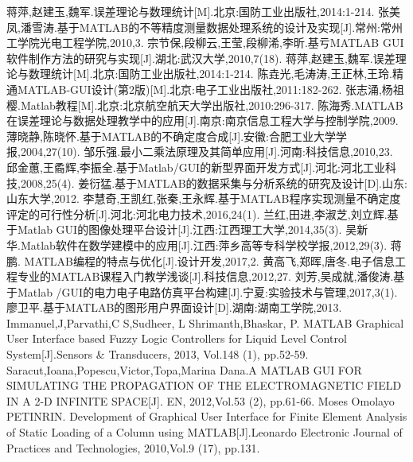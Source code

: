 \begin{thebibliography}{0}
	 蒋萍,赵建玉,魏军.误差理论与数理统计[M].北京:国防工业出版社,2014:1-214.
	 张美凤,潘雪涛.基于MATLAB的不等精度测量数据处理系统的设计及实现[J].常州:常州工学院光电工程学院,2010,3.
	 宗节保,段柳云,王莹,段柳浠,李昕.基亏MATLAB GUI软件制作方法的研究与实现[J].湖北:武汉大学,2010,7(18).
	 蒋萍,赵建玉,魏军.误差理论与数理统计[M].北京:国防工业出版社,2014:1-214.
	 陈垚光,毛涛涛,王正林,王玲.精通MATLAB-GUI设计(第2版)[M].北京:电子工业出版社,2011:182-262.
	 张志涌,杨祖樱.Matlab教程[M].北京:北京航空航天大学出版社,2010:296-317.
	 陈海秀.MATLAB在误差理论与数据处理教学中的应用[J].南京:南京信息工程大学与控制学院,2009.
	 薄晓静,陈晓怀.基于MATLAB的不确定度合成[J].安徽:合肥工业大学学报,2004,27(10).
	 邹乐强.最小二乘法原理及其简单应用[J].河南:科技信息,2010,23.
	 邱金蕙,王矞辉,李振全.基于Matlab/GUI的新型界面开发方式[J].河北:河北工业科技,2008,25(4).
	 姜衍猛.基于MATLAB的数据采集与分析系统的研究及设计[D].山东:山东大学,2012.
	 李慧奇,王凯红,张秦,王永辉.基于MATLAB程序实现测量不确定度评定的可行性分析[J].河北:河北电力技术,2016,24(1).
	 兰红,田进,李淑芝,刘立辉.基于Matlab GUI的图像处理平台设计[J].江西:江西理工大学,2014,35(3).
	 吴新华.Matlab软件在数学建模中的应用[J].江西:萍乡高等专科学校学报,2012,29(3).
	 蒋鹏. MATLAB编程的特点与优化[J].设计开发,2017,2.
	 黄高飞,郑晖,唐冬.电子信息工程专业的MATLAB课程入门教学浅谈[J].科技信息,2012,27.
	 刘芳,吴成就,潘俊涛.基于Matlab /GUI的电力电子电路仿真平台构建[J].宁夏:实验技术与管理,2017,3(1).
	 廖卫平.基于MATLAB的图形用户界面设计[D].湖南:湖南工学院,2013.
	 Immanuel,J,Parvathi,C S,Sudheer, L Shrimanth,Bhaskar, P. MATLAB Graphical User Interface based Fuzzy Logic Controllers for Liquid Level Control System[J].Sensors \& Transducers, 2013, Vol.148 (1), pp.52-59.
	 Saracut,Ioana,Popescu,Victor,Topa,Marina Dana.A MATLAB GUI FOR SIMULATING THE PROPAGATION OF THE ELECTROMAGNETIC FIELD IN A 2-D INFINITE SPACE[J]. EN, 2012,Vol.53 (2), pp.61-66.
	 Moses Omolayo PETINRIN. Development of Graphical User Interface for Finite Element Analysis of Static Loading of a Column using MATLAB[J].Leonardo Electronic Journal of Practices and Technologies, 2010,Vol.9 (17), pp.131.
\end{thebibliography}